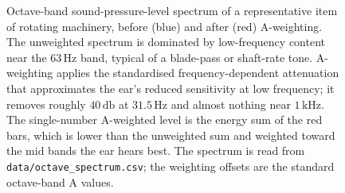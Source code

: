 \begin{figure}[htbp]
\centering
{}
\caption[Octave-band SPL spectrum, unweighted and A-weighted]{Octave-band
sound-pressure-level spectrum of a representative item of rotating
machinery, before (blue) and after (red) A-weighting. The unweighted
spectrum is dominated by low-frequency content near the $63\,\si{\hertz}$
band, typical of a blade-pass or shaft-rate tone. A-weighting applies
the standardised frequency-dependent attenuation that approximates the
ear's reduced sensitivity at low frequency; it removes roughly
$40\,\si{\decibel}$ at $31.5\,\si{\hertz}$ and almost nothing near
$1\,\si{\kilo\hertz}$. The single-number A-weighted level is the
energy sum of the red bars, which is lower than the unweighted sum and
weighted toward the mid bands the ear hears best. The spectrum is read
from \texttt{data/octave\_spectrum.csv}; the weighting offsets are the
standard octave-band A values.}
\label{fig:vol03ch07:spl-octave}
\end{figure}
